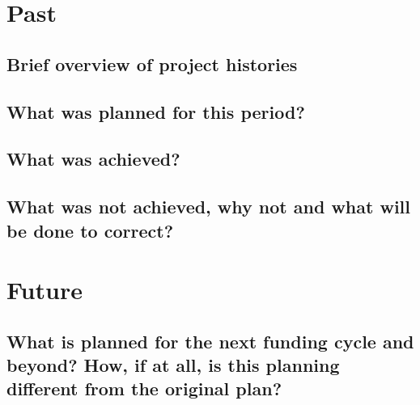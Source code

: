 \documentclass{article}
\begin{document}
%
%

\newpage
\tableofcontents

\renewcommand{\baselinestretch}{1.02}
\newpage
%
\section{Past}
\subsection{Brief overview of project histories}








\subsection{What was planned for this period?} 







%
\subsection{What was achieved?} 







%
\subsection{What was not achieved, why not and what will be done to correct?} 








\section{Future}
\subsection[What is planned for the next funding cycle and beyond?]{What is planned for the next funding cycle and beyond? How, if at all, is this planning different from the original plan?}







\end{document}
